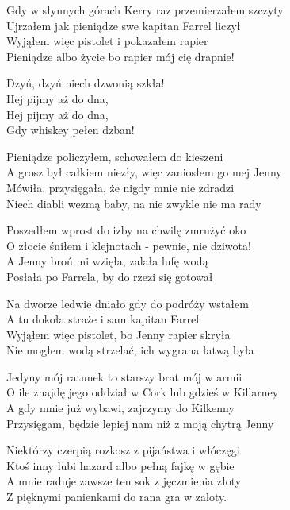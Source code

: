\begin{text}
    Gdy w słynnych górach Kerry raz przemierzałem szczyty\\
    Ujrzałem jak pieniądze swe kapitan Farrel liczył\\
    Wyjąłem więc pistolet i pokazałem rapier\\
    Pieniądze albo życie bo rapier mój cię drapnie!

    \vin Dzyń, dzyń niech dzwonią szkła!\\
    \vin Hej pijmy aż do dna,\\
    \vin Hej pijmy aż do dna,\\
    \vin Gdy whiskey pełen dzban!

    Pieniądze policzyłem, schowałem do kieszeni\\
    A grosz był całkiem niezły, więc zaniosłem go mej Jenny\\
    Mówiła, przysięgała, że nigdy mnie nie zdradzi\\
    Niech diabli wezmą baby, na nie zwykle nie ma rady

    Poszedłem wprost do izby na chwilę zmrużyć oko\\
    O złocie śniłem i klejnotach - pewnie, nie dziwota!\\
    A Jenny broń mi wzięła, zalała lufę wodą\\
    Posłała po Farrela, by do rzezi się gotował

    Na dworze ledwie dniało gdy do podróży wstałem\\
    A tu dokoła straże i sam kapitan Farrel\\
    Wyjąłem więc pistolet, bo Jenny rapier skryła\\
    Nie mogłem wodą strzelać, ich wygrana łatwą była

    Jedyny mój ratunek to starszy brat mój w armii\\
    O ile znajdę jego oddział w Cork lub gdzieś w Killarney\\
    A gdy mnie już wybawi, zajrzymy do Kilkenny\\
    Przysięgam, będzie lepiej nam niż z moją chytrą Jenny

    Niektórzy czerpią rozkosz z pijaństwa i włóczęgi\\
    Ktoś inny lubi hazard albo pełną fajkę w gębie\\
    A mnie raduje zawsze ten sok z jęczmienia złoty\\
    Z pięknymi panienkami do rana gra w zaloty.

\end{text}
